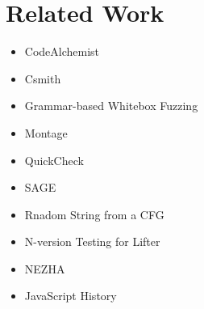 \section{Related Work}\label{sec:related}

\begin{itemize}
  \item CodeAlchemist\cite{codealchemist}
  \item Csmith\cite{csmith}
  \item Grammar-based Whitebox Fuzzing\cite{grammar-whitebox}
  \item Montage\cite{montage}
  \item QuickCheck\cite{quickcheck}
  \item SAGE\cite{sage}
  \item Rnadom String from a CFG\cite{cfg-gen}
  \item N-version Testing for Lifter\cite{ir-diff-test}
  \item NEZHA\cite{nezha}
  \item JavaScript History\cite{js-hopl}

\end{itemize}
